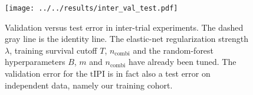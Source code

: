 \begin{figure}
    \centering
    \texttt{[image: ../../results/inter\_val\_test.pdf]}
    \caption{Validation versus test error in inter-trial experiments. The dashed gray line is the 
        identity line. The elastic-net regularization strength $\lambda$, training survival cutoff 
        $T$, $n_\text{combi}$ and the random-forest hyperparameters $B$, $m$ and $n_\text{combi}$ 
        have already been tuned. The validation error for the $\text{tIPI}$ is in fact also a test 
        error on independent data, namely our training cohort.}
    \label{fig:inter-val-test}
\end{figure}